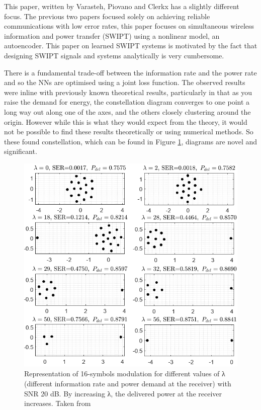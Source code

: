 \documentclass[12pt,onecolumn,letterpaper]{article}
\newcommand\genfigsize{0.5}
\begin{document}
This paper, written by Varasteh, Piovano and Clerkx has a slightly different focus. The previous two papers focused solely on achieving reliable communications with low error rates, this paper focuses on simultaneous wireless information and power transfer (SWIPT) using a nonlinear model, an autoencoder. This paper on learned SWIPT systems is motivated by the fact that designing SWIPT signals and systems analytically is very cumbersome. 

There is a fundamental trade-off between the information rate and the power rate and so the NNs are optimised using a joint loss function. The observed results were inline with previously known theoretical results, particularly in that as you raise the demand for energy, the constellation diagram converges to one point a long way out along one of the axes, and the others closely clustering around the origin. However while this is what they would expect from the theory, it would not be possible to find these results theoretically or using numerical methods. So these found constellation, which can be found in Figure \ref{fig:VarastehConstellationDiagrams}, diagrams are novel and significant.

\begin{figure}[t]
   \centering
   \includegraphics[width=\genfigsize\linewidth]{figures/Varasteh_novel_constellation_diagrams.PNG}
   \caption{Representation of 16-symbols modulation for different values of λ (different information rate and power demand at the receiver) with SNR 20 dB. By increasing λ, the delivered power at the receiver increases. Taken from~\cite{Clerkx}}
\label{fig:VarastehConstellationDiagrams}
\end{figure}
\end{document}
